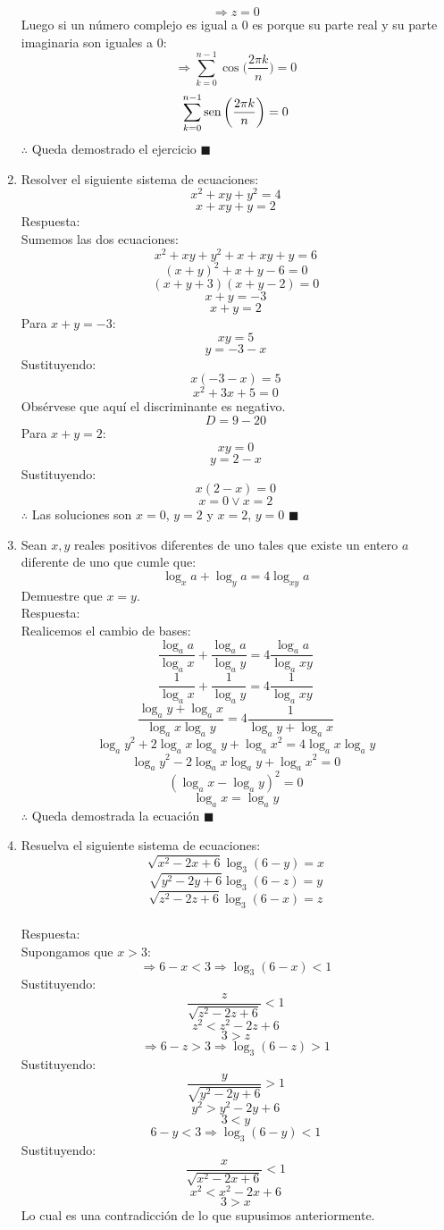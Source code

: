 \documentclass{book}
\newcommand{\sen}{\mathop{\rm sen}\nolimits} %
\begin{document}
\begin{enumerate}
$$\Rightarrow z=0$$
Luego si un número complejo es igual a 0 es porque su parte real y su parte imaginaria son iguales a 0: 
$$\Rightarrow \sum_{k=0}^{n-1}\cos{\bigg(\frac{2\pi k}{n}\bigg)} =0$$
$$\sum_{k=0}^{n-1}\sen{\bigg(\frac{2\pi k}{n}\bigg)}=0$$ 
$\therefore$ Queda demostrado el ejercicio $\blacksquare$\\
				\item Resolver el siguiente sistema de ecuaciones: 
				$$x^2+xy+y^2=4$$
				$$x+xy+y=2$$
				Respuesta:\\
				Sumemos las dos ecuaciones:
$$x^2+xy+y^2+x+xy+y=6$$
$${(x+y)}^2+x+y-6=0$$
$$(x+y+3)(x+y-2)=0$$
$$x+y=-3$$
$$x+y=2$$
Para $x+y=-3$:	
$$xy=5$$
$$y=-3-x$$
Sustituyendo:
$$x(-3-x)=5$$
$$x^2+3x+5=0$$
Obsérvese que aquí el discriminante es negativo.
$$D=9-20$$
Para $x+y=2$:
$$xy=0$$
$$y=2-x$$
Sustituyendo:
$$x(2-x)=0$$
$$x=0  \vee  x=2$$
$\therefore$ Las soluciones son $x=0$, $y=2$  y  $x=2$, $y=0$ $\blacksquare$\\
				\item Sean $x,y$ reales positivos diferentes de uno tales que existe un entero $a$ diferente de uno que cumle que:
				$$\log_{x}a+\log_{y}a=4\log_{xy}a$$
				Demuestre que $x=y$.\\
				Respuesta:\\
				Realicemos el cambio de bases:
$$\frac{\log_{a}a}{\log_{a}x}+\frac{\log_{a}a}{\log_{a}y}=4  \frac{\log_{a}a}{\log_{a}xy}  $$
$$\frac{1}{\log_{a}x} +\frac{1}{\log_{a}y}=4 \frac{1}{\log_{a}xy} $$
$$\frac{\log_{a}y+\log_{a}x}{\log_{a}x\log_{a}y} =4 \frac{1}{\log_{a}y+\log_{a}x }$$
$${\log_{a}y}^2+2 \log_{a}x \log_{a}y +{\log_{a}x}^2=4\log_{a}x \log_{a}y$$
$${\log_{a}y}^2-2 \log_{a}x \log_{a}y +{\log_{a}x}^2=0$$
$${(\log_{a}x -\log_{a}y )} ^2=0$$
$$\log_{a}x =\log_{a}y $$
$\therefore$ Queda demostrada la ecuación $\blacksquare$\\
				\item Resuelva el siguiente sistema de ecuaciones: 
				$$\sqrt{x^2-2x+6}\log_{3}{(6-y)}=x$$
				$$\sqrt{y^2-2y+6}\log_{3}{(6-z)}=y$$
				$$\sqrt{z^2-2z+6}\log_{3}{(6-x)}=z$$\\
				Respuesta:\\
				Supongamos que $x>3$:
$$\Rightarrow 6-x<3\Rightarrow \log_{3}(6-x)<1$$
Sustituyendo:
$$\frac{z}{\sqrt{z^2-2z+6}}<1$$
$$z^2<z^2-2z+6$$
$$3>z$$
$$\Rightarrow 6-z>3\Rightarrow \log_{3}(6-z)>1$$
Sustituyendo:
$$\frac{y}{\sqrt{y^2-2y+6}}>1$$
$$y^2>y^2-2y+6$$
$$3<y$$
$$6-y<3\Rightarrow\log_{3}(6-y)<1$$
Sustituyendo:
$$\frac{x}{\sqrt{x^2-2x+6}}<1$$
$$x^2<x^2-2x+6$$
$$3>x$$
Lo cual es una contradicción de lo que supusimos anteriormente.\\ 

\end{enumerate}
\end{document}
